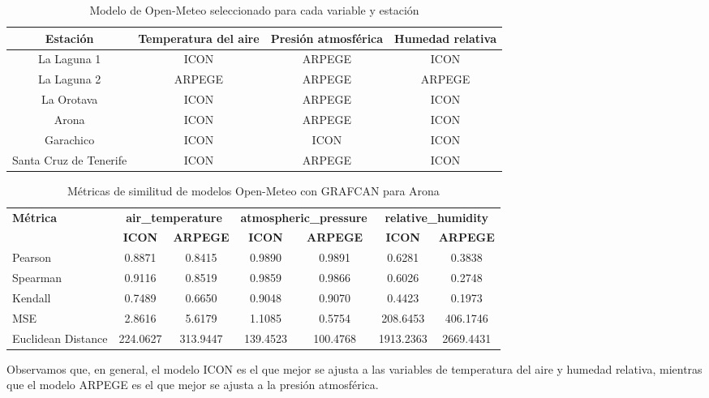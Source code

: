 \begin{table}[htb]
    \small
    \centering
    \begin{tabular}{|c|c|c|c|}
        \hline
        Estación & Temperatura del aire & Presión atmosférica & Humedad relativa \\
        \hline
        La Laguna 1 & ICON & ARPEGE & ICON \\
        La Laguna 2 & ARPEGE & ARPEGE & ARPEGE \\
        La Orotava & ICON & ARPEGE & ICON \\
        Arona & ICON & ARPEGE & ICON \\
        Garachico & ICON & ICON & ICON \\
        Santa Cruz de Tenerife & ICON & ARPEGE & ICON \\
        \hline
    \end{tabular}
    \caption{Modelo de Open-Meteo seleccionado para cada variable y estación}
    \label{tabla_modelos_seleccionados}
\end{table}

\begin{table}[h!]
\centering
\caption{Métricas de similitud de modelos Open-Meteo con GRAFCAN para Arona}
\label{tab:sim_metrics}
\footnotesize {
\begin{tabular}{l  cc  cc  cc}
\toprule
\textbf{Métrica} &
\multicolumn{2}{c}{\textbf{air\_temperature}} &
\multicolumn{2}{c}{\textbf{atmospheric\_pressure}} &
\multicolumn{2}{c}{\textbf{relative\_humidity}} \\
\cmidrule(lr){2-3} \cmidrule(lr){4-5} \cmidrule(lr){6-7}
 & \textbf{ICON} & \textbf{ARPEGE} & \textbf{ICON} & \textbf{ARPEGE} & \textbf{ICON} & \textbf{ARPEGE} \\
\midrule
Pearson               & 0.8871 & 0.8415 & 0.9890 & 0.9891 & 0.6281 & 0.3838 \\
Spearman              & 0.9116 & 0.8519 & 0.9859 & 0.9866 & 0.6026 & 0.2748 \\
Kendall               & 0.7489 & 0.6650 & 0.9048 & 0.9070 & 0.4423 & 0.1973 \\
MSE                   & 2.8616 & 5.6179 & 1.1085 & 0.5754 & 208.6453 & 406.1746 \\
Euclidean Distance    & 224.0627 & 313.9447 & 139.4523 & 100.4768 & 1913.2363 & 2669.4431 \\
\bottomrule
\end{tabular}
}
\end{table}


Observamos que, en general, el modelo ICON es el que mejor se ajusta a las variables de temperatura del aire y humedad relativa,
 mientras que el modelo ARPEGE es el que mejor se ajusta a la presión atmosférica.

